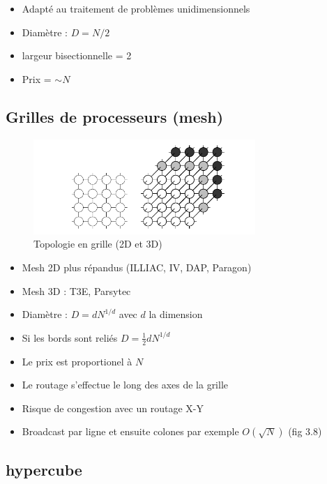 \documentclass[12pt,a4paper,oneside, titlepage]{article}
\begin{document}
    \begin{itemize}
      \item Adapté au traitement de problèmes unidimensionnels
      \item Diamètre : $D = N/2$
      \item largeur bisectionnelle = 2
      \item Prix = $\sim N$
    \end{itemize}

    \subsection*{Grilles de processeurs (mesh)}

    \begin{figure}[H]
      \centering
      \includegraphics[width=0.75\textwidth]{images/mesh}
      \caption{Topologie en grille (2D et 3D)}
    \end{figure}

    \begin{itemize}
      \item Mesh 2D plus répandus (ILLIAC, IV, DAP, Paragon)
      \item Mesh 3D : T3E, Parsytec
      \item Diamètre : $D = d N^{1/d}$ avec $d$ la dimension
      \item Si les bords sont reliés $D = \frac{1}{2} d N^{1/d}$
      \item Le prix est proportionel à $N$
      \item Le routage s'effectue le long des axes de la grille
      \item Risque de congestion avec un routage X-Y
      \item Broadcast par ligne et ensuite colones par exemple $O(\sqrt{N})$ (fig 3.8)
    \end{itemize}

    \subsection*{hypercube}
\end{document}

